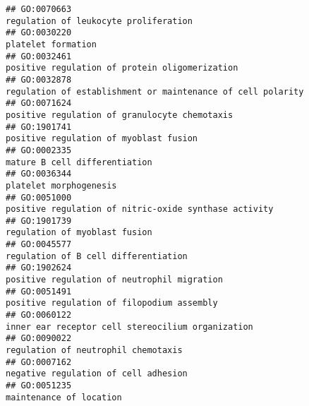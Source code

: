 \documentclass[
]{article}
\begin{document}
\begin{verbatim}
## GO:0070663                                                                                                            regulation of leukocyte proliferation
## GO:0030220                                                                                                                               platelet formation
## GO:0032461                                                                                                   positive regulation of protein oligomerization
## GO:0032878                                                                                      regulation of establishment or maintenance of cell polarity
## GO:0071624                                                                                                    positive regulation of granulocyte chemotaxis
## GO:1901741                                                                                                           positive regulation of myoblast fusion
## GO:0002335                                                                                                                    mature B cell differentiation
## GO:0036344                                                                                                                           platelet morphogenesis
## GO:0051000                                                                                            positive regulation of nitric-oxide synthase activity
## GO:1901739                                                                                                                    regulation of myoblast fusion
## GO:0045577                                                                                                             regulation of B cell differentiation
## GO:1902624                                                                                                      positive regulation of neutrophil migration
## GO:0051491                                                                                                       positive regulation of filopodium assembly
## GO:0060122                                                                                                inner ear receptor cell stereocilium organization
## GO:0090022                                                                                                              regulation of neutrophil chemotaxis
## GO:0007162                                                                                                             negative regulation of cell adhesion
## GO:0051235                                                                                                                          maintenance of location

\end{verbatim}
\end{document}
